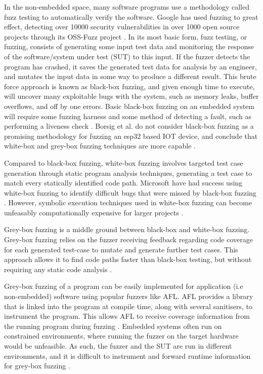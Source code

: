\documentclass[11pt]{article}
\begin{document}
In the non-embedded space, many software programs use a methodology called fuzz
testing to automatically verify the software. Google has used fuzzing to great
effect, detecting over 10000 security vulnerabilities in over 1000 open source
projects through its OSS-Fuzz project \citep{Google_2023}. In its most basic
form, fuzz testing, or fuzzing, consists of generating some input test data and
monitoring the response of the software/system under test (SUT) to this input.
If the fuzzer detects the program has crashed, it saves the generated test data
for analysis by an engineer, and mutates the input data in some way to produce
a different result. This brute force approach is known as black-box fuzzing,
and given enough time to execute, will uncover many exploitable bugs with the
system, such as memory leaks, buffer overflows, and off by one errors. Basic
black-box fuzzing on an embedded system will require some fuzzing harness
\citep{Eisele_et_al_2022} and some method of detecting a fault, such as
performing a liveness check \citep{Yun_2022}. Borsig et al. do not consider
black-box fuzzing as a promising methodology for fuzzing an esp32 based IOT
device, and conclude that white-box and grey-box fuzzing techniques are more
capable \citep{Borsig_2020}.

Compared to black-box fuzzing, white-box fuzzing involves targeted test case
generation through static program analysis techniques, generating a test case
to match every statically identified code path. Microsoft have had success
using white-box fuzzing to identify difficult bugs that were missed by
black-box fuzzing \citep{Godefroid_2012}. However, symbolic execution
techniques used in white-box fuzzing can become unfeasably computationally
expensive for larger projects \citep{Krishnamoorthy_2010}.

Grey-box fuzzing is a middle ground between black-box and white-box fuzzing.
Grey-box fuzzing relies on the fuzzer receiving feedback regarding code
coverage for each generated test-case to mutate and generate further test
cases. This approach allows it to find code paths faster than black-box
testing, but without requiring any static code analysis \citep{Yun_2022}.

Grey-box fuzzing of a program can be easily implemented for application (i.e
non-embedded) software using popular fuzzers like AFL. AFL provides a library
that is linked into the program at compile time, along with several sanitisers,
to instrument the program. This allows AFL to receive coverage information from
the running program during fuzzing \citep{AFL_2019}. Embedded systems often run on
constrained environments, where running the fuzzer on the target hardware would
be unfeasible. As such, the fuzzer and the SUT are run in different
environments, and it is difficult to instrument and forward runtime information
for grey-box fuzzing \citep{Muench_2018}.
\end{document}
